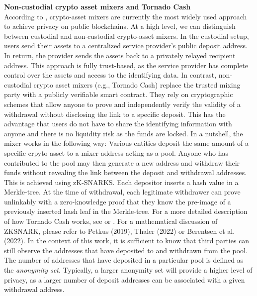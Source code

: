 \documentclass[12pt,a4paper,titlepage,oneside,english]{article}
\begin{document}
\textbf{Non-custodial crypto asset mixers and Tornado Cash} \\
According to \cite{nadler2023tornado}, crypto-asset mixers are currently the most widely used approach to achieve privacy on public blockchains. At a high level, we can distinguish between custodial and non-custodial crypto-asset mixers. \newline
In the custodial setup, users send their assets to a centralized service provider's public deposit address. In return, the provider sends the assets back to a privately relayed recipient address. This approach is fully trust-based, as the service provider has complete control over the assets and access to the identifying data. \newline 
In contrast, non-custodial crypto asset mixers (e.g., Tornado Cash) replace the trusted mixing party with a publicly verifiable smart contract. They rely on cryptographic schemes that allow anyone to prove and independently verify the validity of a withdrawal without disclosing the link to a specific deposit. This has the advantage that users do not have to share the identifying information with anyone and there is no liquidity risk as the funds are locked. \citep{nadler2023tornado} \newline
In a nutshell, the mixer works in the following way: Various entities deposit the same amount of a specific crpyto asset to a mixer address acting as a pool. Anyone who has contributed to the pool may then generate a new address and withdraw their funds without revealing the link between the deposit and withdrawal addresses. This is achieved using zK-SNARKS. 
Each depositor inserts a hash value in a Merkle-tree. At the time of withdrawal, each legitimate withdrawer can prove unlinkably with a zero-knowledge proof that they know the pre-image of a previously inserted hash leaf in the Merkle-tree. %
 For a more detailed description of how Tornado Cash works, see \cite{nadler2023tornado} or \cite{Beres2020}. For a mathematical discussion of ZKSNARK, please refer to Petkus (2019), Thaler (2022) or Berentsen et al. (2022). \newline
In the context of this work, it is sufficient to know that third parties can still observe the addresses that have deposited to and withdrawn from the pool. The number of addresses that have deposited in a particular pool is defined as the \textit{anonymity set}. Typically, a larger anonymity set will provide a higher level of privacy, as a larger number of deposit addresses can be associated with a given withdrawal address. \newline
\end{document}
